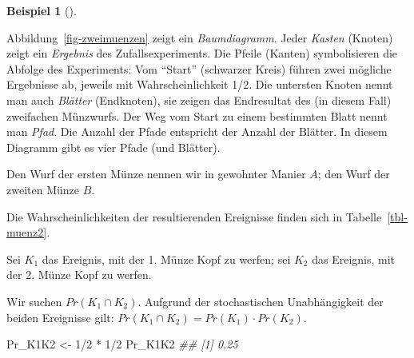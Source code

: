 \documentclass[
  ngerman,
  letterpaper,
  twoside,
  open=any]{scrbook}
\newenvironment{Shaded}{\begin{snugshade}}{\end{snugshade}}
\newcommand{\DecValTok}[1]{\textcolor[rgb]{0.68,0.00,0.00}{#1}}
\newcommand{\DocumentationTok}[1]{\textcolor[rgb]{0.37,0.37,0.37}{\textit{#1}}}
\newcommand{\NormalTok}[1]{\textcolor[rgb]{0.00,0.23,0.31}{#1}}
\newcommand{\OtherTok}[1]{\textcolor[rgb]{0.00,0.23,0.31}{#1}}
\newcommand{\SpecialCharTok}[1]{\textcolor[rgb]{0.37,0.37,0.37}{#1}}
\theoremstyle{definition}
\newtheorem{example}{Beispiel}[chapter]
\theoremstyle{plain}
\theoremstyle{definition}
\theoremstyle{definition}
\theoremstyle{remark}
\begin{document}
\begin{example}[]
\begin{figure}[H]
\end{figure}%

Abbildung~\ref{fig-zweimuenzen} zeigt ein \emph{Baumdiagramm}. Jeder
\emph{Kasten} (Knoten) zeigt ein \emph{Ergebnis} des Zufallsexperiments.
Die Pfeile (Kanten) symbolisieren die Abfolge des Experiments: Vom
\enquote{Start} (schwarzer Kreis) führen zwei mögliche Ergebnisse ab,
jeweils mit Wahrscheinlichkeit 1/2. Die untersten Knoten nennt man auch
\emph{Blätter} (Endknoten), sie zeigen das Endresultat des (in diesem
Fall) zweifachen Münzwurfs. Der Weg vom Start zu einem bestimmten Blatt
nennt man \emph{Pfad}. Die Anzahl der Pfade entspricht der Anzahl der
Blätter. In diesem Diagramm gibt es vier Pfade (und Blätter).

Den Wurf der ersten Münze nennen wir in gewohnter Manier \(A\); den Wurf
der zweiten Münze \(B\).

Die Wahrscheinlichkeiten der resultierenden Ereignisse finden sich in
Tabelle~\ref{tbl-muenz2}.

\begin{table}

\caption{\label{tbl-muenz2}Wahrscheinlichkeiten der Ereignisse im
zweimaligen Münzwurf}


\end{table}%

Sei \(K_1\) das Ereignis, mit der 1. Münze Kopf zu werfen; sei \(K_2\)
das Ereignis, mit der 2. Münze Kopf zu werfen.

Wir suchen \(Pr(K_1 \cap K_2)\). Aufgrund der stochastischen
Unabhängigkeit der beiden Ereignisse gilt:
\(Pr(K_1 \cap K_2) = Pr(K_1) \cdot Pr(K_2)\).

\begin{Shaded}
\begin{Highlighting}[]
\NormalTok{Pr\_K1K2 }\OtherTok{\textless{}{-}} \DecValTok{1}\SpecialCharTok{/}\DecValTok{2} \SpecialCharTok{*} \DecValTok{1}\SpecialCharTok{/}\DecValTok{2}
\NormalTok{Pr\_K1K2}
\DocumentationTok{\#\# [1] 0.25}
\end{Highlighting}
\end{Shaded}


\end{example}
\end{document}
